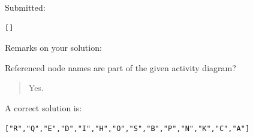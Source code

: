 Submitted:


\begin{verbatim}
[]
\end{verbatim}


Remarks on your solution:

Referenced node names are part of the given activity diagram?\begin{quote}Yes.\end{quote}A correct solution is:
\begin{verbatim}
["R","Q","E","D","I","H","O","S","B","P","N","K","C","A"]
\end{verbatim}


